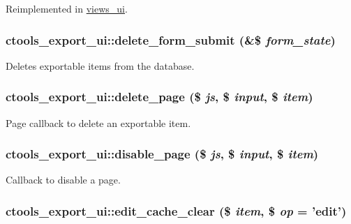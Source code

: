 Reimplemented in \hyperlink{classviews__ui_a5c8914e69b780b3257c15e635f39699c}{views\_\-ui}.\hypertarget{classctools__export__ui_acc9be6d7cff44f93818f021da35b96d5}{
\subsubsection[{delete\_\-form\_\-submit}]{\setlength{\rightskip}{0pt plus 5cm}ctools\_\-export\_\-ui::delete\_\-form\_\-submit (\&\$ {\em form\_\-state})}}
\label{classctools__export__ui_acc9be6d7cff44f93818f021da35b96d5}
Deletes exportable items from the database. \hypertarget{classctools__export__ui_a085f434df28d05870ec395e9d389f29c}{
\subsubsection[{delete\_\-page}]{\setlength{\rightskip}{0pt plus 5cm}ctools\_\-export\_\-ui::delete\_\-page (\$ {\em js}, \/  \$ {\em input}, \/  \$ {\em item})}}
\label{classctools__export__ui_a085f434df28d05870ec395e9d389f29c}
Page callback to delete an exportable item. \hypertarget{classctools__export__ui_a2f660b08aad6dcc3fd84d38c843f815b}{
\subsubsection[{disable\_\-page}]{\setlength{\rightskip}{0pt plus 5cm}ctools\_\-export\_\-ui::disable\_\-page (\$ {\em js}, \/  \$ {\em input}, \/  \$ {\em item})}}
\label{classctools__export__ui_a2f660b08aad6dcc3fd84d38c843f815b}
Callback to disable a page. \hypertarget{classctools__export__ui_a9e88dcc95bc69ece09769f9994aec449}{
\subsubsection[{edit\_\-cache\_\-clear}]{\setlength{\rightskip}{0pt plus 5cm}ctools\_\-export\_\-ui::edit\_\-cache\_\-clear (\$ {\em item}, \/  \$ {\em op} = {\ttfamily 'edit'})}}
